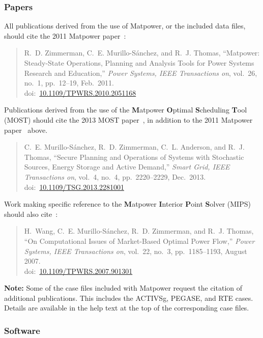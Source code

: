 \documentclass[12pt]{article}
\newcommand{\matpower}[0]{{\sc Matpower}}
\newcommand{\mips}[0]{{MIPS}}
\newcommand{\mipsname}[0]{{{\bf M}{\sc atpower} \textbf{I}nterior \textbf{P}oint \textbf{S}olver}}
\newcommand{\most}[0]{{MOST}}
\newcommand{\mostname}[0]{{{\bf M}{\sc atpower} \textbf{O}ptimal \textbf{S}cheduling \textbf{T}ool}}
\newcommand{\doi}[1]{doi:~\href{https://doi.org/#1}{#1}}
\numberwithin{equation}{section}
\numberwithin{table}{section}
\numberwithin{figure}{section}
\begin{document}
\subsubsection*{Papers}

All publications derived from the use of \matpower{}, or the included data files, should cite the 2011 \matpower{} paper~\cite{zimmerman2011}:

\begin{quote}
\footnotesize
R.~D. Zimmerman, C.~E. Murillo-S{\'a}nchez, and R.~J. Thomas, ``\matpower{}: Steady-State Operations, Planning and Analysis Tools for Power Systems Research and Education,'' \emph{Power Systems, IEEE Transactions on}, vol.~26, no.~1, pp.~12--19, Feb.~2011.\\
\doi{10.1109/TPWRS.2010.2051168}
\end{quote}

Publications derived from the use of the \mostname{} (\most{}) should cite the 2013 MOST paper~\cite{murillo-sanchez2013a}, in addition to the 2011 \matpower{} paper~\cite{zimmerman2011} above.

\begin{quote}
\footnotesize
C.~E. Murillo-S{\'a}nchez, R.~D. Zimmerman, C.~L. Anderson, and R.~J. Thomas, ``Secure Planning and Operations of Systems with Stochastic Sources, Energy Storage and Active Demand,'' \emph{Smart Grid, IEEE Transactions on}, vol.~4, no.~4, pp.~2220--2229, Dec.~2013.\\
\doi{10.1109/TSG.2013.2281001}
\end{quote}

Work making specific reference to the \mipsname{} (\mips{}) should also cite~\cite{wang2007a}:

\begin{quote}
\footnotesize
H.~Wang, C.~E. Murillo-S{\'a}nchez, R.~D. Zimmerman, and R.~J. Thomas, ``On
Computational Issues of Market-Based Optimal Power Flow,'' \emph{Power
Systems, IEEE Transactions on}, vol.~22, no.~3, pp.~1185--1193, August 2007.\\
\doi{10.1109/TPWRS.2007.901301}
\end{quote}

\textbf{Note:} Some of the case files included with \matpower{} request the citation
of additional publications. This includes the ACTIVSg, PEGASE, and
RTE cases. Details are available in the help text at the top of the
corresponding case files.

\subsubsection*{Software}
\end{document}
